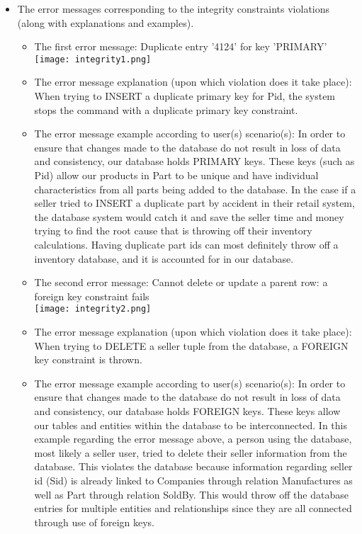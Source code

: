 {\begin{itemize}
\item{}
	The error messages corresponding to the integrity constraints violations (along with explanations and examples).
	\begin{itemize} 
	\item{The first error message: }
	Duplicate entry '4124' for key 'PRIMARY'\\
	\texttt{[image: integrity1.png]}
	\item{The error message explanation (upon which violation does it take place): }
	When trying to INSERT a duplicate primary key for Pid, the system stops the command with a duplicate primary key constraint.  
	\item{The error message example according to user(s) scenario(s): }
	In order to ensure that changes made to the database do not result in loss of data and consistency, our database holds PRIMARY keys. These keys (such as Pid) allow our products in Part to be unique and have individual characteristics from all parts being added to the database. In the case if a seller tried to INSERT a duplicate part by accident in their retail system, the database system would catch it and save the seller time and money trying to find the root cause that is throwing off their inventory calculations. Having duplicate part ids can most definitely throw off a inventory database, and it is accounted for in our database.
	 \end{itemize}
	 	\begin{itemize} 
	\item{The second error message: }
	Cannot delete or update a parent row: a foreign key constraint fails\\
	\texttt{[image: integrity2.png]}
	\item{The error message explanation (upon which violation does it take place): }
	When trying to DELETE a seller tuple from the database, a FOREIGN key constraint is thrown.
	\item{The error message example according to user(s) scenario(s): }
	In order to ensure that changes made to the database do not result in loss of data and consistency, our database holds FOREIGN keys. These keys allow our tables and entities within the database to be interconnected. In this example regarding the error message above, a person using the database, most likely a seller user, tried to delete their seller information from the database. This violates the database because information regarding seller id (Sid) is already linked to Companies through relation Manufactures as well as Part through relation SoldBy. This would throw off the database entries for multiple entities and relationships since they are all connected through use of foreign keys.

\end{itemize}
\end{itemize}}
